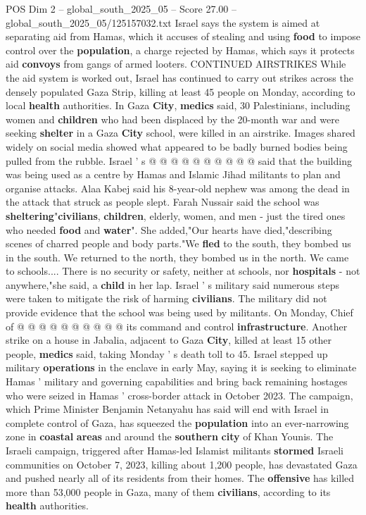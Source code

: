\begin{textsample}{POS Dim 2 – global\_south\_2025\_05 – Score 27.00 – global\_south\_2025\_05/125157032.txt}
Israel says the system is aimed at separating aid from Hamas, which it accuses of stealing and using \textbf{food} to impose control over the \textbf{population}, a charge rejected by Hamas, which says it protects aid \textbf{convoys} from gangs of armed looters.
CONTINUED AIRSTRIKES While the aid system is worked out, Israel has continued to carry out strikes across the densely populated Gaza Strip, killing at least 45 people on Monday, according to local \textbf{health} authorities.
In Gaza \textbf{City}, \textbf{medics} said, 30 Palestinians, including women and \textbf{children} who had been displaced by the 20-month war and were seeking \textbf{shelter} in a Gaza \textbf{City} school, were killed in an airstrike.
Images shared widely on social media showed what appeared to be badly burned bodies being pulled from the rubble.
Israel ' s @ @ @ @ @ @ @ @ @ @ said that the building was being used as a centre by Hamas and Islamic Jihad militants to plan and organise attacks.
Alaa Kabej said his 8-year-old nephew was among the dead in the attack that struck as people slept.
Farah Nussair said the school was \textbf{sheltering}"\textbf{civilians}, \textbf{children}, elderly, women, and men - just the tired ones who needed \textbf{food} and \textbf{water}".
She added,"Our hearts have died,"describing scenes of charred people and body parts."We \textbf{fled} to the south, they bombed us in the south.
We returned to the north, they bombed us in the north.
We came to schools....
There is no security or safety, neither at schools, nor \textbf{hospitals} - not anywhere,"she said, a \textbf{child} in her lap.
Israel ' s military said numerous steps were taken to mitigate the risk of harming \textbf{civilians}.
The military did not provide evidence that the school was being used by militants.
On Monday, Chief of @ @ @ @ @ @ @ @ @ @ its command and control \textbf{infrastructure}.
Another strike on a house in Jabalia, adjacent to Gaza \textbf{City}, killed at least 15 other people, \textbf{medics} said, taking Monday ' s death toll to 45.
Israel stepped up military \textbf{operations} in the enclave in early May, saying it is seeking to eliminate Hamas ' military and governing capabilities and bring back remaining hostages who were seized in Hamas ' cross-border attack in October 2023.
The campaign, which Prime Minister Benjamin Netanyahu has said will end with Israel in complete control of Gaza, has squeezed the \textbf{population} into an ever-narrowing zone in \textbf{coastal} \textbf{areas} and around the \textbf{southern} \textbf{city} of Khan Younis.
The Israeli campaign, triggered after Hamas-led Islamist militants \textbf{stormed} Israeli communities on October 7, 2023, killing about 1,200 people, has devastated Gaza and pushed nearly all of its residents from their homes.
The \textbf{offensive} has killed more than 53,000 people in Gaza, many of them \textbf{civilians}, according to its \textbf{health} authorities.

\end{textsample}
